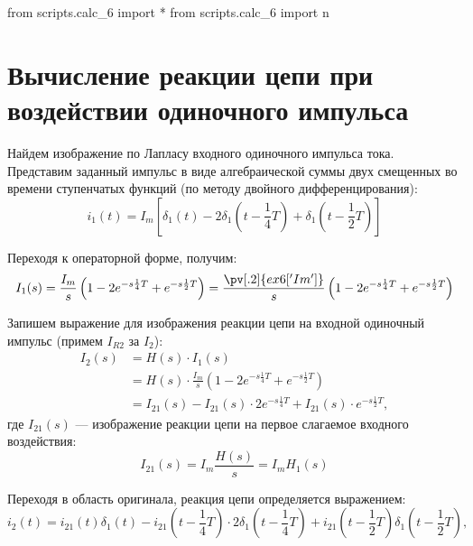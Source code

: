 \begin{python}
from scripts.calc_6 import *
from scripts.calc_6 import n
\end{python}

\section{Вычисление реакции цепи при воздействии одиночного импульса}
\label{sec:opermethod}

Найдем изображение по Лапласу входного одиночного импульса тока. Представим заданный импульс в виде алгебраической суммы двух смещенных во времени ступенчатых функций (по методу двойного дифференцирования):
\begin{equation}
    i_1(t) = I_m \left[
        \delta_1(t) -
        2\delta_1(t - \frac14 T) + 
        \delta_1(t - \frac12 T)
    \right]
\end{equation}

Переходя к операторной форме, получим:
\begin{equation}
    I_1(s)
        = \frac{I_m}{s} \left(
            1 - 2e^{-s \frac14 T} + e^{-s \frac12 T}
        \right)
        = \frac{\pv[.2]{ex6['Im']}}{s} \left(
            1 - 2e^{-s \frac14 T} + e^{-s \frac12 T}
        \right)
\end{equation}

Запишем выражение для изображения реакции цепи на входной одиночный импульс (примем $I_{R2}$ за $I_2$):
\begin{align}
    I_{2}(s) 
        &= H(s) \cdot I_1(s) \\
        &= H(s) \cdot \frac{I_m}{s} \left(
            1 - 2e^{-s \frac14 T} + e^{-s \frac12 T}
        \right) \\
        &=  
            I_{21}(s) -
            I_{21}(s) \cdot 2e^{-s \frac14 T} +
            I_{21}(s) \cdot e^{-s \frac12 T},
\end{align}
где $I_{21}(s)$ — изображение реакции цепи на первое слагаемое входного воздействия:
\begin{equation}
    I_{21}(s) = I_m \frac{H(s)}{s} = I_m H_1(s)
\end{equation}

Переходя в область оригинала, реакция цепи определяется выражением:
\begin{equation}
    i_2(t)
        = 
            i_{21}(t)\delta_1(t) -
            i_{21}(t - \frac14 T)\cdot 2\delta_1(t - \frac14 T) +
            i_{21}(t - \frac12 T)\delta_1(t - \frac12 T),
    \label{form:i2torig}
\end{equation}

